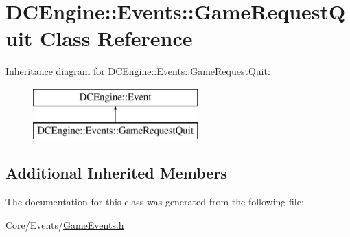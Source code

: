 \hypertarget{classDCEngine_1_1Events_1_1GameRequestQuit}{\section{D\-C\-Engine\-:\-:Events\-:\-:Game\-Request\-Quit Class Reference}
\label{classDCEngine_1_1Events_1_1GameRequestQuit}
}
Inheritance diagram for D\-C\-Engine\-:\-:Events\-:\-:Game\-Request\-Quit\-:\begin{figure}[H]
\begin{center}
\leavevmode
\includegraphics[height=2.000000cm]{classDCEngine_1_1Events_1_1GameRequestQuit}
\end{center}
\end{figure}
\subsection*{Additional Inherited Members}


The documentation for this class was generated from the following file\-:\begin{DoxyCompactItemize}
\item 
Core/\-Events/\hyperlink{GameEvents_8h}{Game\-Events.\-h}\end{DoxyCompactItemize}
